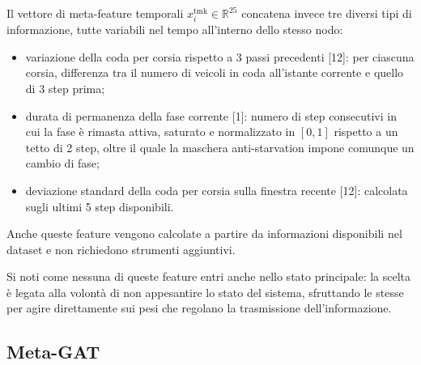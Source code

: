 Il vettore di meta-feature temporali $x^{\mathrm{tmk}}_i \in \mathbb{R}^{25}$
concatena invece tre diversi tipi di informazione, tutte variabili nel tempo all'interno dello stesso nodo:
\begin{itemize}
  \item variazione della coda per corsia rispetto a 3 passi precedenti [12]: per ciascuna corsia, differenza tra il numero di veicoli in coda all'istante corrente e quello di 3 step prima;
  \item durata di permanenza della fase corrente [1]: numero di step consecutivi in cui la fase è rimasta attiva, saturato e normalizzato in $[0,1]$ rispetto a un tetto di 2 step, oltre il quale la maschera anti-starvation impone comunque un cambio di fase;
  \item deviazione standard della coda per corsia sulla finestra recente [12]: calcolata sugli ultimi 5 step disponibili.
\end{itemize}
Anche queste feature vengono calcolate a partire da informazioni disponibili nel dataset e non richiedono strumenti aggiuntivi.

Si noti come nessuna di queste feature entri anche nello stato principale: la scelta
è legata alla volontà di non appesantire lo stato del sistema, sfruttando le stesse
per agire direttamente sui pesi che regolano la trasmissione dell'informazione.

\subsection{Meta-GAT}
\label{subsec:meta-gat}

